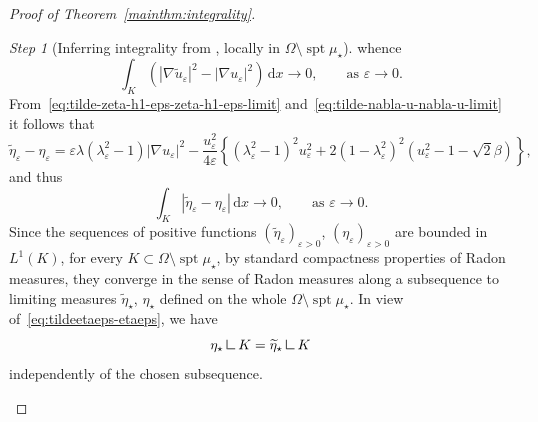 \documentclass[a4paper, 11pt, twoside, leqno]{article}
\theoremstyle{definition}              %
\theoremstyle{remark}                  %
\newtheorem{step}{Step}
\DeclareMathOperator{\spt}{spt}                                     %
\newcommand{\abs}[1]{\left| #1 \right|}                             %
\renewcommand{\d}{\mathrm{d}}
\newcommand{\eps}{\varepsilon}
\newcommand{\mres}{\mathbin{\vrule height 1.6ex depth 0pt width
0.13ex\vrule height 0.13ex depth 0pt width 1.3ex}}
\begin{document}
\begin{proof}[{Proof of Theorem~\ref{mainthm:integrality}}]
\begin{step}[Inferring integrality from \cite{NagaseTonegawa}, locally in $\Omega \setminus \spt\mu_\star$]
	whence
	\begin{equation}\label{eq:tilde-nabla-u-nabla-u-limit}
		\int_K \left( \abs{\nabla \widetilde{u}_\eps}^2 - \abs{\nabla u_\eps}^2\right)\,{\d}x 
		\to 0, \qquad \mbox{as } \eps \to 0.
	\end{equation}
	From~\eqref{eq:tilde-zeta-h1-eps-zeta-h1-eps-limit} 
	and~\eqref{eq:tilde-nabla-u-nabla-u-limit} it follows that 
	\begin{equation}\label{eq:tildeetaeps-etaeps-pointwise}		
	\widetilde{\eta}_\eps - \eta_\eps 
		= \eps\lambda\left(\lambda_\eps^2-1\right)\abs{\nabla u_\eps}^2 
		- \frac{u^2_\eps}{4\eps}\left\{ \left(\lambda_\eps^2 - 1\right)^2 u_\eps^2 + 2\left(1-\lambda_\eps^2\right)^2 \left(u_\eps^2-1-\sqrt{2}\beta\right)  \right\}, 
	\end{equation}
	and thus 
	\begin{equation}\label{eq:tildeetaeps-etaeps}
		\int_K \abs{\widetilde{\eta}_\eps - \eta_\eps} \,{\d}x \to 0, 
		\qquad \mbox{as } \eps \to 0.
	\end{equation}
	Since the sequences of positive functions 
	$\left( \widetilde{\eta}_\eps \right)_{\eps > 0}$, 
	$\left( \eta_\eps \right)_{\eps > 0}$ are bounded in $L^1(K)$, 
	for every $K \subset \Omega \setminus \spt \mu_\star$, by standard compactness 
	properties of Radon measures, they 
	converge in the sense of Radon measures along a subsequence to limiting measures 
	$\widetilde{\eta}_\star$, $\eta_\star$ defined on the whole $\Omega \setminus \spt\mu_\star$. 
	In view of~\eqref{eq:tildeetaeps-etaeps}, we have 
	\begin{equation}\label{eq:tildeeta*-eta*}
		\eta_\star \mres K = \widetilde{\eta}_\star \mres K	
	\end{equation}
	independently of the chosen subsequence.
	

\end{step}
\end{proof}
\end{document}
